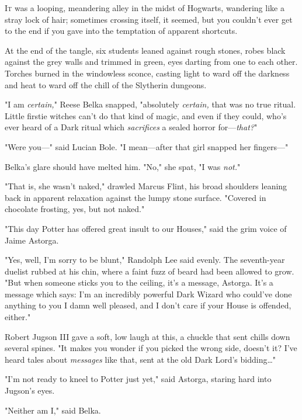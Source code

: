 
\lettrine{I}{t} was a looping, 
meandering alley in the midst of Hogwarts, wandering like a stray lock of hair; 
sometimes crossing itself, it seemed, but you couldn't ever get to the end if 
you gave into the temptation of apparent shortcuts.

At the end of the tangle, six students leaned against rough stones, robes black 
against the grey walls and trimmed in green, eyes darting from one to each 
other. Torches burned in the windowless sconce, casting light to ward off the 
darkness and heat to ward off the chill of the Slytherin dungeons.

"I am \emph{certain,}" Reese Belka snapped, "absolutely \emph{certain,} that 
was no true ritual. Little firstie witches can't do that kind of magic, and 
even if they could, who's ever heard of a Dark ritual which \emph{sacrifices} a 
sealed horror for---\emph{that?}"

"Were you---" said Lucian Bole. "I mean---after that girl snapped her 
fingers---"

Belka's glare should have melted him. "No," she spat, "I was \emph{not.}"

"That is, she wasn't naked," drawled Marcus Flint, his broad shoulders leaning 
back in apparent relaxation against the lumpy stone surface. "Covered in 
chocolate frosting, yes, but not naked."

"This day Potter has offered great insult to our Houses," said the grim voice 
of Jaime Astorga.

"Yes, well, I'm sorry to be blunt," Randolph Lee said evenly. The seventh-year 
duelist rubbed at his chin, where a faint fuzz of beard had been allowed to 
grow. "But when someone sticks you to the ceiling, it's a message, Astorga. 
It's a message which says: I'm an incredibly powerful Dark Wizard who could've 
done anything to you I damn well pleased, and I don't care if your House is 
offended, either."

Robert Jugson III gave a soft, low laugh at this, a chuckle that sent chills 
down several spines. "It makes you wonder if you picked the wrong side, doesn't 
it? I've heard tales about \emph{messages} like that, sent at the old Dark 
Lord's bidding{\ldots}"

"I'm not ready to kneel to Potter just yet," said Astorga, staring hard into 
Jugson's eyes.

"Neither am I," said Belka.

